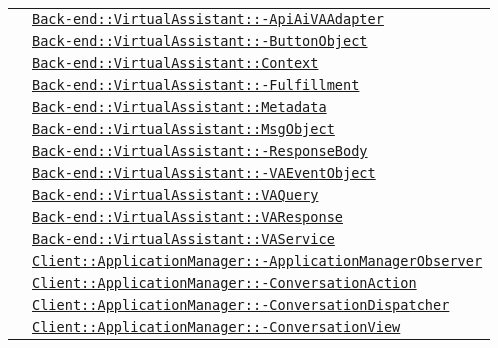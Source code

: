 \begin{longtable}{|>{\centering}m{3cm}|m{10cm}<{\centering}|}
& \hyperref[Back-end::VirtualAssistant::ApiAiVAAdapter]{\texttt{Back-end::VirtualAssistant::-\linebreak ApiAiVAAdapter}}\\
& \hyperref[Back-end::VirtualAssistant::ButtonObject]{\texttt{Back-end::VirtualAssistant::-\linebreak ButtonObject}}\\
& \hyperref[Back-end::VirtualAssistant::Context]{\texttt{Back-end::VirtualAssistant::Context}}\\
& \hyperref[Back-end::VirtualAssistant::Fulfillment]{\texttt{Back-end::VirtualAssistant::-\linebreak Fulfillment}}\\
& \hyperref[Back-end::VirtualAssistant::Metadata]{\texttt{Back-end::VirtualAssistant::Metadata}}\\
& \hyperref[Back-end::VirtualAssistant::MsgObject]{\texttt{Back-end::VirtualAssistant::MsgObject}}\\
& \hyperref[Back-end::VirtualAssistant::ResponseBody]{\texttt{Back-end::VirtualAssistant::-\linebreak ResponseBody}}\\
& \hyperref[Back-end::VirtualAssistant::VAEventObject]{\texttt{Back-end::VirtualAssistant::-\linebreak VAEventObject}}\\
& \hyperref[Back-end::VirtualAssistant::VAQuery]{\texttt{Back-end::VirtualAssistant::VAQuery}}\\
& \hyperref[Back-end::VirtualAssistant::VAResponse]{\texttt{Back-end::VirtualAssistant::VAResponse}}\\
& \hyperref[Back-end::VirtualAssistant::VAService]{\texttt{Back-end::VirtualAssistant::VAService}}\\
& \hyperref[Client::ApplicationManager::ApplicationManagerObserver]{\texttt{Client::ApplicationManager::-\linebreak ApplicationManagerObserver}}\\
& \hyperref[Client::ApplicationManager::ConversationAction]{\texttt{Client::ApplicationManager::-\linebreak ConversationAction}}\\
& \hyperref[Client::ApplicationManager::ConversationDispatcher]{\texttt{Client::ApplicationManager::-\linebreak ConversationDispatcher}}\\
& \hyperref[Client::ApplicationManager::ConversationView]{\texttt{Client::ApplicationManager::-\linebreak ConversationView}}\\

\end{longtable}
